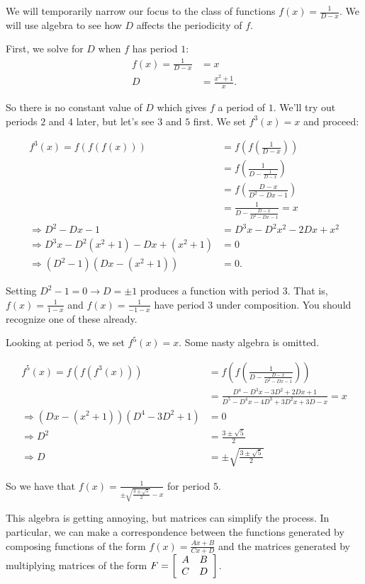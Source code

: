 \documentclass[../gatm.tex]{subfiles}
\begin{document}
\noindent We will temporarily narrow our focus to the class of functions $f(x)=\frac{1}{D-x}$. We will use algebra to see how $D$ affects the periodicity of $f$.

First, we solve for $D$ when $f$ has period $1$:
\begin{align*}
f(x)=\frac{1}{D-x}&=x \\
D&=\frac{x^2+1}{x}.
\end{align*}

\noindent So there is no constant value of $D$ which gives $f$ a period of $1$. We'll try out periods $2$ and $4$ later, but let's see $3$ and $5$ first. We set $f^3(x)=x$ and proceed:

\allowdisplaybreaks
\begin{align*}
f^3(x)=f(f(f(x)))&=f\left(f\left(\frac{1}{D-x}\right)\right) \\
&= f\left(\frac{1}{D-\frac{1}{D-x}}\right) \\
&= f\left(\frac{D-x}{D^2-Dx-1}\right) \\
&= \frac{1}{D-\frac{D-x}{D^2-Dx-1}} = x \\
\Longrightarrow D^2-Dx-1&=D^3x-D^2x^2-2Dx+x^2 \\
\Longrightarrow D^3x-D^2(x^2+1)-Dx+(x^2+1)&=0 \\
\Longrightarrow (D^2-1)(Dx-(x^2+1))&=0.
\end{align*}

\noindent Setting $D^2-1=0\rightarrow D=\pm 1$ produces a function with period $3$. That is, $f(x)=\frac{1}{1-x}$ and $f(x)=\frac{1}{-1-x}$ have period $3$ under composition. You should recognize one of these already.

Looking at period $5$, we set $f^5(x)=x$. Some nasty algebra is omitted.

\begin{align*}
f^5(x)=f(f(f^3(x)))&=f\left(f\left(\frac{1}{D-\frac{D-x}{D^2-Dx-1}}\right)\right) \\
&=\frac{D^4-D^3x-3D^2+2Dx+1}{D^5-D^4x-4D^3+3D^2x+3D-x}=x \\
\Longrightarrow (Dx-(x^2+1))(D^4-3D^2+1)&=0 \\
\Longrightarrow D^2&=\frac{3\pm\sqrt{5}}{2} \\
\Longrightarrow D &= \pm{\sqrt{\frac{3\pm\sqrt{5}}{2}}}
\end{align*}

\noindent So we have that $f(x)=\frac{1}{\pm\sqrt{\frac{3\pm\sqrt{5}}{2}}-x}$ for period $5$.

This algebra is getting annoying, but matrices can simplify the process. In particular, we can make a correspondence between the functions generated by composing functions of the form $f(x)=\frac{Ax+B}{Cx+D}$ and the matrices generated by multiplying matrices of the form $F=\left[\begin{array}{cc} A & B \\ C & D \end{array}\right]$.
\end{document}
